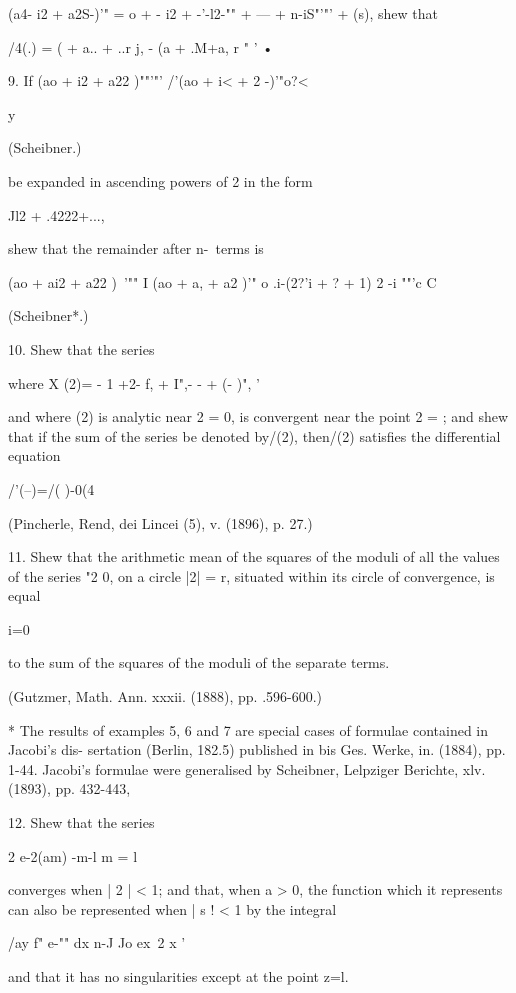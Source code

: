 {{{{(a4- i2 + a2S-)'" = o + - i2 + -'-l2-"" + --- + n-iS"'"' + (s), shew
that

/4(.) = ( + a.. + ..r j, - (a + .M+a, r " ' •

9. If (ao + i2 + a22 )""'"' /'(ao + i< + 2 -)'"o?<

y

(Scheibner.)

be expanded in ascending powers of 2 in the form

Jl2 + .4222+...,

shew that the remainder after n-\ terms is

(ao + ai2 + a22 )~'"" I (ao + a, + a2 )'" o .i-(2?'i + ? + 1) 2 -i
""'c C

(Scheibner*.)

10. Shew that the series

where X (2)= - 1 +2- f, + I",- - + (- )", '

and where (2) is analytic near 2 = 0, is convergent near the point 2 =
; and shew that if the sum of the series be denoted by/(2), then/(2)
satisfies the differential equation

/'(--)=/( )-0(4

(Pincherle, Rend, dei Lincei (5), v. (1896), p. 27.)

11. Shew that the arithmetic mean of the squares of the moduli of all
the values of the series "2 0, on a circle |2| = r, situated within
its circle of convergence, is equal

 i=0

to the sum of the squares of the moduli of the separate terms.

(Gutzmer, Math. Ann. xxxii. (1888), pp. .596-600.)

* The results of examples 5, 6 and 7 are special cases of formulae
contained in Jacobi's dis- sertation (Berlin, 182.5) published in bis
Ges. Werke, in. (1884), pp. 1-44. Jacobi's formulae were generalised
by Scheibner, Lelpziger Berichte, xlv. (1893), pp. 432-443,

%
%

12. Shew that the series

2 e-2(am) -m-l m = l

converges when | 2 | < 1; and that, when a > 0, the function which it
represents can also be represented when | s ! < 1 by the integral

/ay f" e-"" dx n-J Jo ex\ 2 x '

and that it has no singularities except at the point z=l.

}}}}
